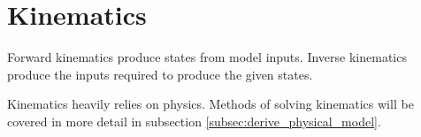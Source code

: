 
\chapter{Kinematics}

Forward kinematics produce states from model inputs. Inverse kinematics produce
the inputs required to produce the given states.

Kinematics heavily relies on physics. Methods of solving kinematics will be
covered in more detail in subsection \ref{subsec:derive_physical_model}.

\renewcommand*{\chapterpath}{\partpath/kinematics}



